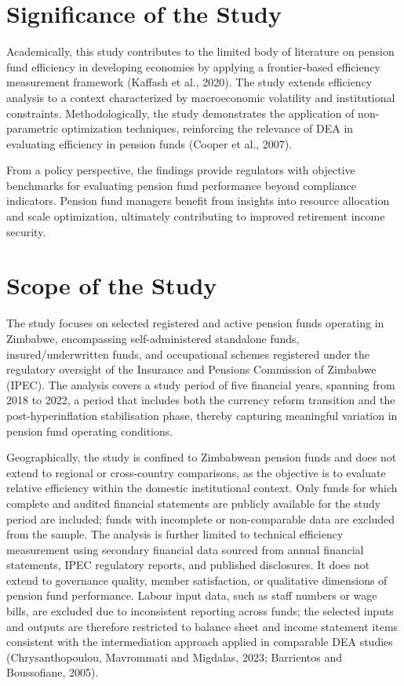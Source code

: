 \documentclass[12pt,a4paper]{article}
\begin{document}
\section{Significance of the Study}

Academically, this study contributes to the limited body of literature on pension fund efficiency in developing economies by applying a frontier-based efficiency measurement framework (Kaffash et al., 2020). The study extends efficiency analysis to a context characterized by macroeconomic volatility and institutional constraints. Methodologically, the study demonstrates the application of non-parametric optimization techniques, reinforcing the relevance of DEA in evaluating efficiency in pension funds (Cooper et al., 2007).

From a policy perspective, the findings provide regulators with objective benchmarks for evaluating pension fund performance beyond compliance indicators. Pension fund managers benefit from insights into resource allocation and scale optimization, ultimately contributing to improved retirement income security.

\section{Scope of the Study}

The study focuses on selected registered and active pension funds operating in Zimbabwe, encompassing self-administered standalone funds, insured/underwritten funds, and occupational schemes registered under the regulatory oversight of the Insurance and Pensions Commission of Zimbabwe (IPEC). The analysis covers a study period of five financial years, spanning from 2018 to 2022, a period that includes both the currency reform transition and the post-hyperinflation stabilisation phase, thereby capturing meaningful variation in pension fund operating conditions.

Geographically, the study is confined to Zimbabwean pension funds and does not extend to regional or cross-country comparisons, as the objective is to evaluate relative efficiency within the domestic institutional context. Only funds for which complete and audited financial statements are publicly available for the study period are included; funds with incomplete or non-comparable data are excluded from the sample. The analysis is further limited to technical efficiency measurement using secondary financial data sourced from annual financial statements, IPEC regulatory reports, and published disclosures. It does not extend to governance quality, member satisfaction, or qualitative dimensions of pension fund performance. Labour input data, such as staff numbers or wage bills, are excluded due to inconsistent reporting across funds; the selected inputs and outputs are therefore restricted to balance sheet and income statement items consistent with the intermediation approach applied in comparable DEA studies (Chrysanthopoulou, Mavrommati and Migdalas, 2023; Barrientos and Boussofiane, 2005).
\end{document}

